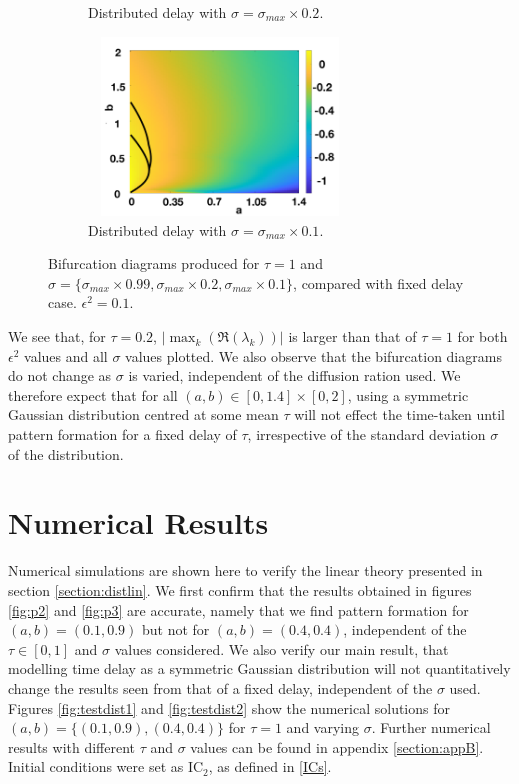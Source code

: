 \begin{figure}[H]
\begin{subfigure}[b]{0.45\textwidth}
        \caption{Distributed delay with $\sigma=\sigma_{max}\times0.2$.}
        \label{}
    \end{subfigure}
    \hfill
    \begin{subfigure}[b]{0.45\textwidth}
        \centering
        \includegraphics[width=7cm,height=4.75cm]{distbif44.png}
        \caption{Distributed delay with $\sigma=\sigma_{max}\times0.1$.}
        \label{}
    \end{subfigure}
    \caption{Bifurcation diagrams produced for $\tau=1$ and $\sigma=\{ \sigma_{max}\times0.99,\sigma_{max}\times0.2,\sigma_{max}\times0.1 \}$, compared with fixed delay case. $\epsilon^2=0.1$.}
    \label{fig:distbif4}
\end{figure}

We see that, for $\tau=0.2$, $|\max_k(\Re(\lambda_k))|$ is larger than that of $\tau=1$ for both $\epsilon^2$ values and all $\sigma$ values plotted. We also observe that the bifurcation diagrams do not change as $\sigma$ is varied, independent of the diffusion ration used. We therefore expect that for all $(a,b)\in[0,1.4]\times[0,2]$, using a symmetric Gaussian distribution centred at some mean $\tau$ will not effect the time-taken until pattern formation for a fixed delay of $\tau$, irrespective of the standard deviation $\sigma$ of the distribution.


\section{Numerical Results}\label{section:distsim}
Numerical simulations are shown here to verify the linear theory presented in section \ref{section:distlin}. We first confirm that the results obtained in figures \ref{fig:p2} and \ref{fig:p3} are accurate, namely that we find pattern formation for $(a,b)=(0.1,0.9)$ but not for $(a,b)=(0.4,0.4)$, independent of the $\tau\in[0,1]$ and $\sigma$ values considered. We also verify our main result, that modelling time delay as a symmetric Gaussian distribution will not quantitatively change the results seen from that of a fixed delay, independent of the $\sigma$ used. Figures \ref{fig:testdist1} and \ref{fig:testdist2} show the numerical solutions for $(a,b)=\{(0.1,0.9),(0.4,0.4)\}$ for $\tau=1$ and varying $\sigma$. Further numerical results with different $\tau$ and $\sigma$ values can be found in appendix \ref{section:appB}. Initial conditions were set as $\text{IC}_2$, as defined in \eqref{ICs}.

